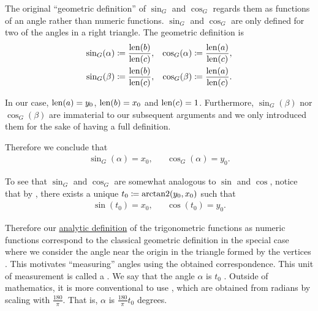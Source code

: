 \begin{Definition}
  The original \enquote{geometric definition} of \( \sin_G \) and \( \cos_G \) regards them as functions of an angle rather than numeric functions. \( \sin_G \) and \( \cos_G \) are only defined for two of the angles in a right triangle. The geometric definition is
  \begin{align*}
    \sin_G(\alpha) \coloneqq \frac{\operatorname{len}(b)} {\operatorname{len}(c)}, && \cos_G(\alpha) \coloneqq \frac{\operatorname{len}(a)} {\operatorname{len}(c)},
    \\
    \sin_G(\beta) \coloneqq \frac{\operatorname{len}(b)} {\operatorname{len}(c)}, && \cos_G(\beta) \coloneqq \frac{\operatorname{len}(a)} {\operatorname{len}(c)}.
  \end{align*}

  In our case, \( \operatorname{len}(a) = y_0 \), \( \operatorname{len}(b) = x_0 \) and \( \operatorname{len}(c) = 1 \). Furthermore, \( \sin_G(\beta) \) nor \( \cos_G(
  \beta) \) are immaterial to our subsequent arguments and we only introduced them for the sake of having a full definition.

  Therefore we conclude that
  \begin{align*}
    \sin_G(\alpha) = x_0,
    &&
    \cos_G(\alpha) = y_0.
  \end{align*}

  To see that \( \sin_G \) and \( \cos_G \) are somewhat analogous to \( \sin \) and \( \cos \), notice that by , there exists a unique \( t_0 \coloneqq \operatorname{arctan2}(y_0, x_0) \) such that
  \begin{align*}
    \sin(t_0) = x_0,
    &&
    \cos(t_0) = y_0.
  \end{align*}

  Therefore our \hyperref[def:trigonometric_functions]{analytic definition} of the trigonometric functions as numeric functions correspond to the classical geometric definition in the special case where we consider the angle near the origin in the triangle formed by the vertices . This motivates \enquote{measuring} angles using the obtained correspondence. This unit of measurement is called a . We say that the angle \( \alpha \) is \( t_0 \) . Outside of mathematics, it is more conventional to use , which are obtained from radians by scaling with \( \tfrac {180} {\pi} \). That is, \( \alpha \) is \( \tfrac {180} {\pi} t_0 \) degrees.
\end{Definition}
